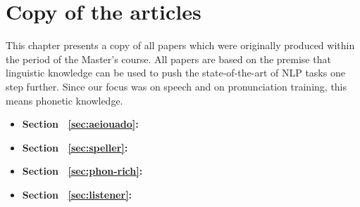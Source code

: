 \chapter{Copy of the articles}\label{ch:articles}

This chapter presents a copy of all papers which were originally produced within the period of the Master's course. All papers are based on the premise that linguistic knowledge can be used to push the state-of-the-art of NLP tasks one step further. Since our focus was on speech and on pronunciation training, this means phonetic knowledge.


\begin{itemize}
\item \textbf{Section ~\ref{sec:aeiouado}:} 
\item \textbf{Section ~\ref{sec:speller}:} 
\item \textbf{Section ~\ref{sec:phon-rich}:} 
\item \textbf{Section ~\ref{sec:listener}:} 
\end{itemize}


\cleardoublepage

\label{sec:aeiouado}
%
\cleardoublepage

\label{sec:speller}
%

\label{sec:phon-rich}
%
\cleardoublepage

\label{sec:listener}
%

